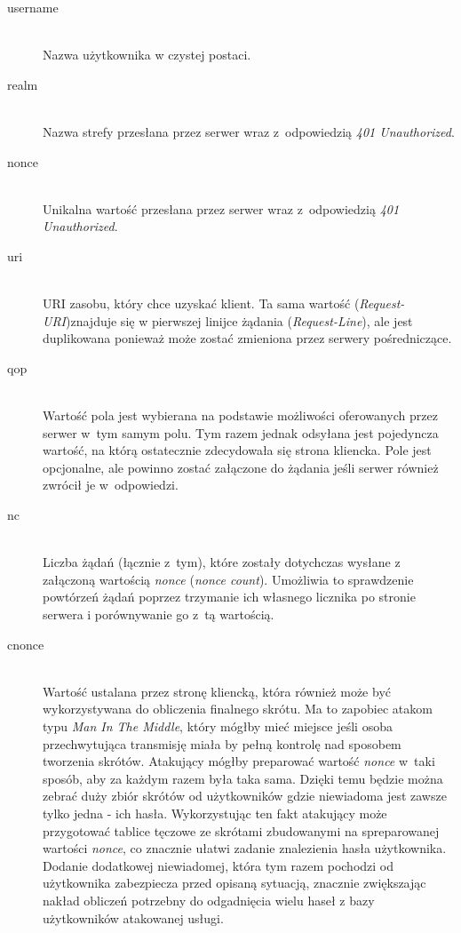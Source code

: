 \documentclass[11pt]{aghdpl}
\begin{document}
\begin{description}
\item[username] \hfill \\
Nazwa użytkownika w czystej postaci.
\item[realm] \hfill \\
Nazwa strefy przesłana przez serwer wraz z~odpowiedzią \emph{401 Unauthorized}.
\item[nonce] \hfill \\
Unikalna wartość przesłana przez serwer wraz z~odpowiedzią \emph{401 Unauthorized}.
\item[uri] \hfill \\
URI zasobu, który chce uzyskać klient. Ta sama wartość (\emph{Request-URI})znajduje się w pierwszej linijce żądania (\emph{Request-Line}), ale jest duplikowana ponieważ może zostać zmieniona przez serwery pośredniczące.
\item[qop] \hfill \\
Wartość pola jest wybierana na podstawie możliwości oferowanych przez serwer w~tym samym polu. Tym razem jednak odsyłana jest pojedyncza wartość, na którą ostatecznie zdecydowała się strona kliencka. Pole jest opcjonalne, ale powinno zostać załączone do żądania jeśli serwer również zwrócił je w~odpowiedzi.
\item[nc] \hfill \\
Liczba żądań (łącznie z~tym), które zostały dotychczas wysłane z załączoną wartością \emph{nonce} (\emph{nonce count}). Umożliwia to sprawdzenie powtórzeń żądań poprzez trzymanie ich własnego licznika po stronie serwera i porównywanie go z~tą wartością.
\item[cnonce] \hfill \\
Wartość ustalana przez stronę kliencką, która również może być wykorzystywana do obliczenia finalnego skrótu. Ma to zapobiec atakom typu \emph{Man In The Middle}, który mógłby mieć miejsce jeśli osoba przechwytująca transmisję miała by pełną kontrolę nad sposobem tworzenia skrótów. Atakujący mógłby preparować wartość \emph{nonce} w~taki sposób, aby za każdym razem była taka sama. Dzięki temu będzie można zebrać duży zbiór skrótów od użytkowników gdzie niewiadoma jest zawsze tylko jedna - ich hasła. Wykorzystując ten fakt atakujący może przygotować tablice tęczowe ze skrótami zbudowanymi na spreparowanej wartości \emph{nonce}, co znacznie ułatwi zadanie znalezienia hasła użytkownika. Dodanie dodatkowej niewiadomej, która tym razem pochodzi od użytkownika zabezpiecza przed opisaną sytuacją, znacznie zwiększając nakład obliczeń potrzebny do odgadnięcia wielu haseł z bazy użytkowników atakowanej usługi.

\end{description}
\end{document}
